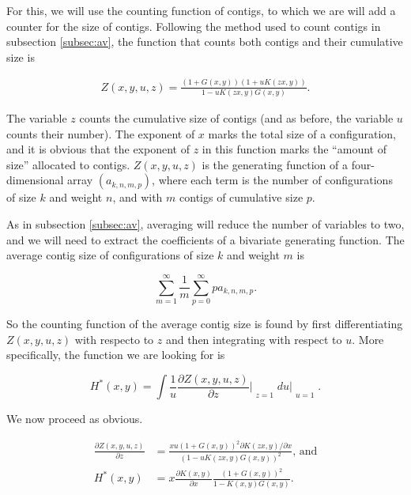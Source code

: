 \documentclass{article}
\begin{document}
For this, we will use the counting function of contigs, to which we are
will add a counter for the size of contigs. Following the method used to
count contigs in subsection \ref{subsec:av}, the function that counts
both contigs and their cumulative size is

\begin{equation*}
\begin{split}
Z(x,y,u,z) = \frac{(1+G(x,y))(1+uK(zx,y))}{1-uK(zx,y)G(x,y)}.
\end{split}
\end{equation*}

The variable $z$ counts the cumulative size of contigs (and as before, the
variable $u$ counts their number). The exponent of $x$ marks the total
size of a configuration, and it is obvious that the exponent of $z$ in
this function marks the ``amount of size'' allocated to contigs.
$Z(x,y,u,z)$ is the generating function of a four-dimensional array
$(a_{k,n,m,p})$, where each term is the number of configurations of size
$k$ and weight $n$, and with $m$ contigs of cumulative size $p$.

As in subsection \ref{subsec:av}, averaging will reduce the number of
variables to two, and we will need to extract the coefficients of a
bivariate generating function. The average contig size of configurations
of size $k$ and weight $m$ is

\begin{equation*}
\sum_{m=1}^\infty\frac{1}{m}\sum_{p=0}^\infty pa_{k,n,m,p}.
\end{equation*}

So the counting function of the average contig size is found by first
differentiating $Z(x,y,u,z)$ with respecto to $z$ and then integrating
with respect to $u$. More specifically, the function we are looking for is

\begin{equation*}
H^*(x,y) = \int \frac{1}{u}
\frac{\partial Z(x,y,u,z)}{\partial z}\Bigr|_{\substack{\\z=1}} du
\biggr|_{\substack{\\u=1}}.
\end{equation*}

We now proceed as obvious.

\begin{equation*}
\begin{split}
\frac{\partial Z(x,y,u,z)}{\partial z} &=
\frac{xu\left(1+G(x,y)\right)^2 \partial K(zx,y)/ \partial x}
{\left(1-uK(zx,y)G(x,y)\right)^2} \text{, and} \\
H^*(x,y) &=  x \frac{\partial K(x,y)}{\partial x}
\frac{\left(1+G(x,y)\right)^2}{1-K(x,y)G(x,y)}.
\end{split}
\end{equation*}
\end{document}
